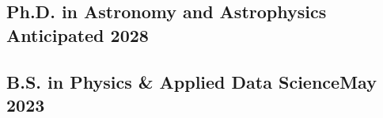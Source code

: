 \subsection{{Ph.D. in Astronomy and Astrophysics} \hfill Anticipated 2028}

\vspace*{8pt}

\subsection {{B.S. in Physics \& Applied Data Science}\hfill May 2023}



\vspace*{3pt}
